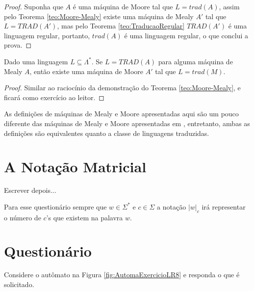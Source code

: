 \begin{proof}
	Suponha que $A$ é uma máquina de Moore tal que $L = trad(A)$, assim pelo Teorema \ref{teo:Moore-Mealy} existe uma máquina de Mealy $A'$ tal que $L = TRAD(A')$, mas pelo Teorema \ref{teo:TraducaoRegular} $TRAD(A')$ é uma linguagem regular, portanto, $trad(A)$ é uma linguagem regular, o que conclui a prova.
\end{proof}

\begin{theorem}\label{teo:Mealy-Moore}
	Dado uma linguagem $L \subseteq \Lambda^*$. Se $L = TRAD(A)$ para alguma máquina de Mealy $A$,  então existe uma máquina de Moore $A'$ tal que $L = trad(M)$.
\end{theorem}

\begin{proof}
	Similar ao raciocínio da demonstração do Teorema \ref{teo:Moore-Mealy}, e ficará como exercício ao leitor.
\end{proof}

\begin{remark}
	As definições de máquinas de Mealy e Moore apresentadas aqui são um pouco diferente das máquinas de Mealy e Moore apresentadas em \cite{menezes1998LFA}, entretanto, ambas as definições são equivalentes quanto a classe de linguagens traduzidas.
\end{remark}

\section{A Notação Matricial}\label{sec:NotacaoMatricial}

{\color{red}Escrever depois...}

\begin{remark}
	Para esse questionário sempre que $w \in \Sigma^*$ e $c \in \Sigma$ a notação $|w|_c$ irá representar o número de $c$'s que existem na palavra $w$.
\end{remark}

\section{Questionário}\label{sec:Questionario2part4}

\begin{problem}\label{prob:Regulares1}
	Considere o autômato na Figura \ref{fig:AutomaExercicioLR8} e responda o que é solicitado.
\end{problem}

